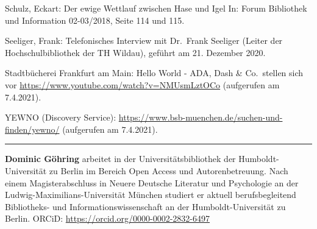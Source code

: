 \documentclass[a4paper,
fontsize=11pt,
oneside,
numbers=noperiodatend,
parskip=half-,
bibliography=totoc,
final
]{scrartcl}
\begin{document}
Schulz, Eckart: Der ewige Wettlauf zwischen Hase und Igel In: Forum
Bibliothek und Information 02-03/2018, Seite 114 und 115.

Seeliger, Frank: Telefonisches Interview mit Dr.~Frank Seeliger (Leiter
der Hochschulbibliothek der TH Wildau), geführt am 21. Dezember 2020.

Stadtbücherei Frankfurt am Main: Hello World - ADA, Dash \& Co.~stellen
sich vor \url{https://www.youtube.com/watch?v=NMUsmLztOCo} (aufgerufen
am 7.4.2021).

YEWNO (Discovery Service):
\url{https://www.bsb-muenchen.de/suchen-und-finden/yewno/} (aufgerufen
am 7.4.2021).

\begin{center}\rule{0.5\linewidth}{0.5pt}\end{center}

\textbf{Dominic Göhring} arbeitet in der Universitätsbibliothek der Humboldt-Universität zu Berlin im Bereich Open Access und Autorenbetreuung. Nach einem Magisterabschluss in Neuere Deutsche Literatur und Psychologie an der Ludwig-Maximilians-Universität München studiert er aktuell berufsbegleitend Bibliotheks- und Informationswissenschaft an der Humboldt-Universität zu Berlin. ORCiD: \url{https://orcid.org/0000-0002-2832-6497}
\end{document}
